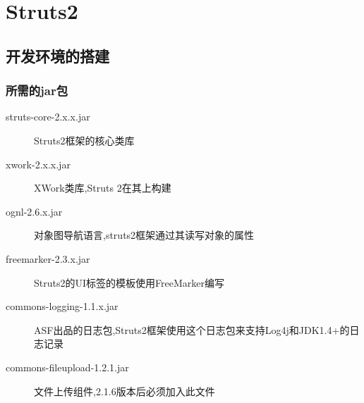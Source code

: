 \section{Struts2}
\subsection{开发环境的搭建}
\subsubsection{所需的jar包}
\begin{description}
\item[struts-core-2.x.x.jar]	Struts2框架的核心类库
\item[xwork-2.x.x.jar]	XWork类库,Struts 2在其上构建
\item[ognl-2.6.x.jar]	对象图导航语言,struts2框架通过其读写对象的属性
\item[freemarker-2.3.x.jar]	Struts2的UI标签的模板使用FreeMarker编写
\item[commons-logging-1.1.x.jar]	ASF出品的日志包,Struts2框架使用这个日志包来支持Log4j和JDK1.4+的日志记录
\item[commons-fileupload-1.2.1.jar]	文件上传组件,2.1.6版本后必须加入此文件  
\end{description}

